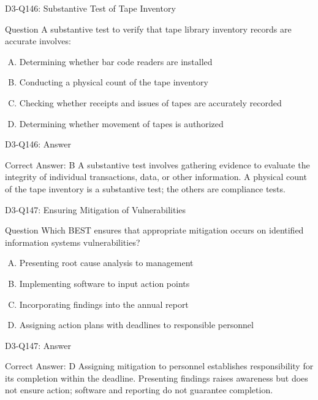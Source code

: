 \documentclass{beamer}
\begin{document}
	\begin{frame}{D3-Q146: Substantive Test of Tape Inventory}
		\begin{block}{Question}
			A substantive test to verify that tape library inventory records are accurate involves:
		\end{block}
		\begin{enumerate}[(A)]
			\item Determining whether bar code readers are installed
			\item Conducting a physical count of the tape inventory
			\item Checking whether receipts and issues of tapes are accurately recorded
			\item Determining whether movement of tapes is authorized
		\end{enumerate}
	\end{frame}
	\begin{frame}{D3-Q146: Answer}
		\begin{block}{Correct Answer: B}
			A substantive test involves gathering evidence to evaluate the integrity of individual transactions, data, or other information. A physical count of the tape inventory is a substantive test; the others are compliance tests.
		\end{block}
	\end{frame}
	
	\begin{frame}{D3-Q147: Ensuring Mitigation of Vulnerabilities}
		\begin{block}{Question}
			Which BEST ensures that appropriate mitigation occurs on identified information systems vulnerabilities?
		\end{block}
		\begin{enumerate}[(A)]
			\item Presenting root cause analysis to management
			\item Implementing software to input action points
			\item Incorporating findings into the annual report
			\item Assigning action plans with deadlines to responsible personnel
		\end{enumerate}
	\end{frame}
	\begin{frame}{D3-Q147: Answer}
		\begin{block}{Correct Answer: D}
			Assigning mitigation to personnel establishes responsibility for its completion within the deadline. Presenting findings raises awareness but does not ensure action; software and reporting do not guarantee completion.
		\end{block}
	\end{frame}
	
\end{document}
